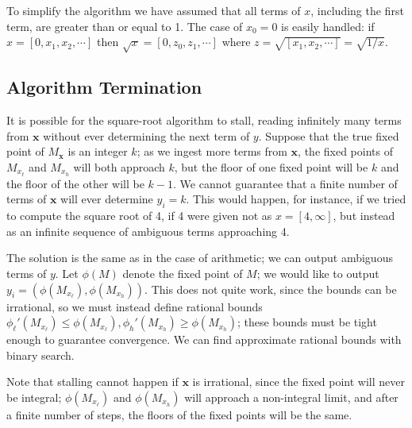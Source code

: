 \documentclass[11pt, oneside]{amsart}   	%
\begin{document}
To simplify the algorithm we have assumed that all terms of $x$, including the first term, are greater than or equal to 1. The case of $x_0=0$ is easily handled: if $x = [0,x_1,x_2,\cdots]$ then $\sqrt{x} = [0,z_0,z_1,\cdots]$ where $z = \sqrt{[x_1,x_2,\cdots]} = \sqrt{1/x}$.


\subsection{Algorithm Termination}
It is possible for the square-root algorithm to stall, reading infinitely many terms from $\mathbf{x}$ without ever determining the next term of $y$.
Suppose that the true fixed point of $M_\mathbf{x}$ is an integer $k$; as we ingest more terms from $\mathbf{x}$, the fixed points of $M_{x_\ell}$ and $M_{x_h}$ will both approach  $k$, but the floor of one fixed point will be $k$ and the floor of the other will be $k-1$.
We cannot guarantee that a finite number of terms of $\mathbf{x}$ will ever determine $y_i=k$.
This would happen, for instance, if we tried to compute the square root of 4, if 4 were given not as $x=[4,\infty]$, but instead as an infinite sequence of ambiguous terms approaching 4.

The solution is the same as in the case of arithmetic; we can output ambiguous terms of $y$. Let $\phi(M)$ denote the fixed point of $M$; we would like to output $y_i = (\phi(M_{x_\ell}), \phi(M_{x_h}))$. This does not quite work, since the bounds can be irrational, so we must instead define rational bounds ${\phi_\ell}'(M_{x_\ell}) \leq \phi(M_{x_\ell}), {\phi_h}'(M_{x_h}) \geq \phi(M_{x_h})$;  these bounds must be tight enough to guarantee convergence. We can find approximate rational bounds with binary search.

Note that stalling cannot happen if $\mathbf{x}$ is irrational, since the fixed point will never be integral; $\phi(M_{x_\ell})$ and $\phi(M_{x_h})$ will approach a non-integral limit, and after a finite number of steps, the floors of the fixed points will be the same.
\end{document}
